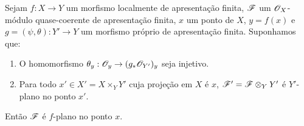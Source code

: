 \begin{proposition}[11.5.3]
\label{IV.11.5.3}
Sejam $f:X\to Y$ um morfismo
localmente de apresentação
finita, $\mathscr{F}$ um
$\mathscr{O}_X$-módulo
quase-coerente de apresentação
finita, $x$ um ponto de $X$,
$y=f(x)$ e
$g=(\psi,\theta):Y'\to Y$
um morfismo próprio de
apresentação finita.
Suponhamos que:
\begin{enumerate}[label=(\roman*)]
\item O homomorfismo
$\theta_y:\sh{O}_y\to
(g_*\sh{O}_{Y'})_y$
seja injetivo.
\item Para todo
$x'\in X'=X\times_Y Y'$
cuja projeção em $X$ é
$x$, $\mathscr{F}'=\mathscr{F}
\otimes_Y Y'$ é
$Y'$-plano no ponto $x'$.
\end{enumerate}
Então $\mathscr{F}$ é
$f$-plano no ponto $x$.
\end{proposition}

